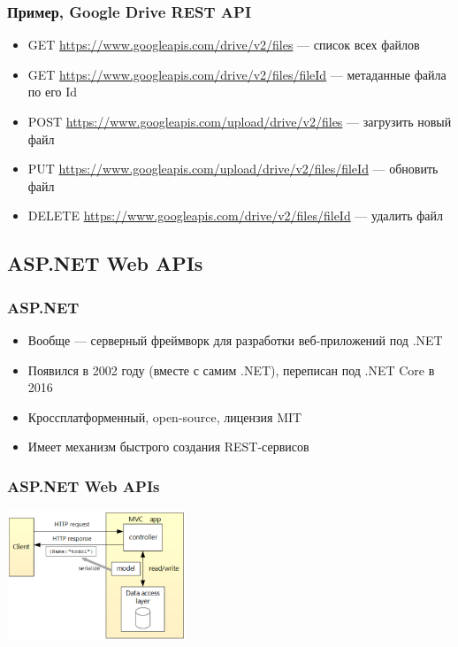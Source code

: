 \documentclass{../../slides-style}
\begin{document}
    \begin{frame}
        \frametitle{Пример, Google Drive REST API}
        \begin{itemize}
            \item GET \url{https://www.googleapis.com/drive/v2/files} --- список всех файлов
            \item GET \url{https://www.googleapis.com/drive/v2/files/fileId} --- метаданные файла по его Id
            \item POST \url{https://www.googleapis.com/upload/drive/v2/files} — загрузить новый файл
            \item PUT \url{https://www.googleapis.com/upload/drive/v2/files/fileId} --- обновить файл
            \item DELETE \url{https://www.googleapis.com/drive/v2/files/fileId} --- удалить файл
        \end{itemize}
    \end{frame}

    \subsection{ASP.NET Web APIs}

    \begin{frame}
        \frametitle{ASP.NET}
        \begin{itemize}
            \item Вообще --- серверный фреймворк для разработки веб-приложений под .NET
            \item Появился в 2002 году (вместе с самим .NET), переписан под .NET Core в 2016
            \item Кроссплатформенный, open-source, лицензия MIT
            \item Имеет механизм быстрого создания REST-сервисов
        \end{itemize}
    \end{frame}

    \begin{frame}
        \frametitle{ASP.NET Web APIs}
        \begin{center}
            \includegraphics[width=0.4\textwidth]{webApiServiceDesign.png}
        \end{center}
    \end{frame}
\end{document}
